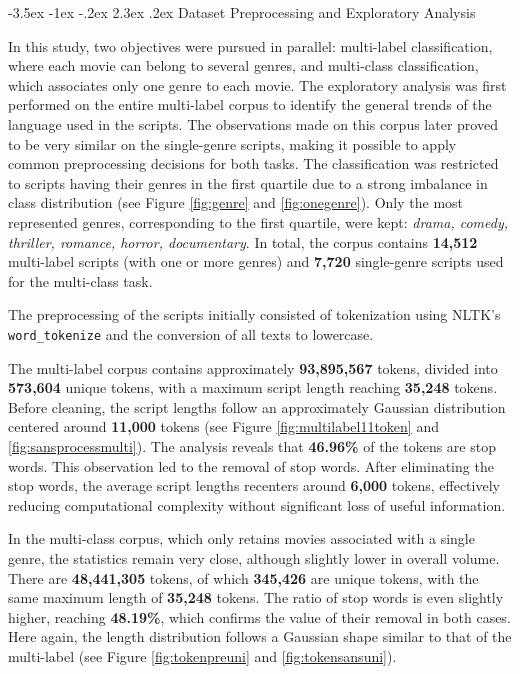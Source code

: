 \documentclass[12pt]{report}
\makeatletter
\renewcommand{\chapter}{\@startsection{chapter}{0}{\z@}
  {-3.5ex \@plus -1ex \@minus -.2ex}
  {2.3ex \@plus.2ex}
  {\normalfont\LARGE\bfseries}}
\makeatother
\begin{document}
\chapter{Dataset Preprocessing and Exploratory Analysis}

In this study, two objectives were pursued in parallel: multi-label classification, where each movie can belong to several genres, and multi-class classification, which associates only one genre to each movie. The exploratory analysis was first performed on the entire multi-label corpus to identify the general trends of the language used in the scripts. The observations made on this corpus later proved to be very similar on the single-genre scripts, making it possible to apply common preprocessing decisions for both tasks. The classification was restricted to scripts having their genres in the first quartile due to a strong imbalance in class distribution (see Figure \ref{fig:genre} and \ref{fig:onegenre}). Only the most represented genres, corresponding to the first quartile, were kept: \textit{drama, comedy, thriller, romance, horror, documentary}. In total, the corpus contains \textbf{14,512} multi-label scripts (with one or more genres) and \textbf{7,720} single-genre scripts used for the multi-class task. 

The preprocessing of the scripts initially consisted of tokenization using NLTK's \texttt{word\_tokenize} and the conversion of all texts to lowercase. 

The multi-label corpus contains approximately \textbf{93,895,567} tokens, divided into \textbf{573,604} unique tokens, with a maximum script length reaching \textbf{35,248} tokens. Before cleaning, the script lengths follow an approximately Gaussian distribution centered around \textbf{11,000} tokens (see Figure \ref{fig:multilabel11token} and \ref{fig:sansprocessmulti}). The analysis reveals that \textbf{46.96\%} of the tokens are stop words. This observation led to the removal of stop words. After eliminating the stop words, the average script lengths recenters around \textbf{6,000} tokens, effectively reducing computational complexity without significant loss of useful information.\newline


In the multi-class corpus, which only retains movies associated with a single genre, the statistics remain very close, although slightly lower in overall volume. There are \textbf{48,441,305} tokens, of which \textbf{345,426} are unique tokens, with the same maximum length of \textbf{35,248} tokens. The ratio of stop words is even slightly higher, reaching \textbf{48.19\%}, which confirms the value of their removal in both cases. Here again, the length distribution follows a Gaussian shape similar to that of the multi-label (see Figure \ref{fig:tokenpreuni} and \ref{fig:tokensansuni}). 
\end{document}
